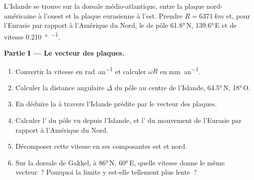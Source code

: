 \begin{problem}
\label{pb:b1:plate-kinematics:1}
L'Islande se trouve sur la dorsale médio-atlantique, entre la plaque nord-américaine à
l'ouest et la plaque eurasienne à l'est. Prendre $R = \qty{6371}{km}$ et, pour
l'Eurasie par rapport à l'Amérique du Nord, le  de pôle
\ang{61.8}\,N, \ang{139.6}\,E et de vitesse \qty{0.210}{\degree\per\Ma}.

\medskip
\noindent\textbf{Partie I --- Le vecteur des plaques.}
\begin{enumerate}
  \item Convertir la vitesse en \unit{rad.an^{-1}} et calculer $\omega R$ en
        \unit{mm.an^{-1}}.
  \item Calculer la distance angulaire $\Delta$ du pôle au centre de
        l'Islande, \ang{64.5}\,N, \ang{18}\,O.
  \item En déduire la  à travers l'Islande prédite par le vecteur
        des plaques.
  \item Calculer l' du pôle vu depuis l'Islande, et l' du
        mouvement de l'Eurasie par rapport à l'Amérique du Nord.
  \item Décomposer cette vitesse en ses composantes est et nord.
  \item Sur la dorsale de Gakkel, à \ang{86}\,N, \ang{60}\,E, quelle vitesse donne le même
        vecteur~? Pourquoi la limite y est-elle tellement plus lente~?
\end{enumerate}


\end{problem}
